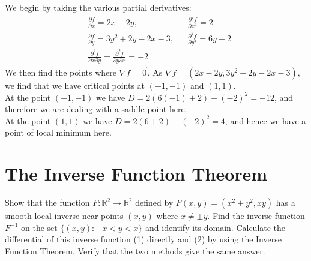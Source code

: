 \documentclass[12pt]{book}
\newcommand{\R}{\mathbb{R}}
\newenvironment{exercise}[2][Exercise]{\begin{trivlist}
\item[\hskip \labelsep {\bfseries #1}\hskip \labelsep {\bfseries #2.}]}{\end{trivlist}}
\begin{document}
\begin{exercise}{7.2.7}
\begin{exercise}{9.5.9}
    We begin by taking the various partial derivatives:
    \begin{align*}
        &\frac{\partial f}{\partial x} = 2x-2y, &&\frac{\partial^2 f}{\partial x^2} = 2 \\
        &\frac{\partial f}{\partial y} = 3y^2+2y-2x-3, &&\frac{\partial^2 f}{\partial y^2}=6y+2\\
        &\frac{\partial^2 f}{\partial x \partial y} = \frac{\partial^2 f}{\partial y \partial x} = -2
    \end{align*}
    We then find the points where $\nabla f= \vec{0}$. As $\nabla f= \left( 2x-2y, 3y^2+2y-2x-3\right)$, we find that we have critical points at $(-1,-1)$ and $(1,1)$. \\
    At the point $(-1,-1)$ we have $D=2 (6(-1)+2) - (-2)^2= -12$, and therefore we are dealing with a saddle point here.\\
    At the point $(1,1)$ we have $D=2(6+2)-(-2)^2=4$, and hence we have a point of local minimum here.
\end{exercise}




\section{The Inverse Function Theorem}


\begin{exercise}{9.6.2}
    Show that the function $F: \R^2 \to \R^2$ defined by $F(x,y) = (x^2+y^2, x y)$ has a smooth local inverse near points $(x,y)$ where $x \neq \pm y$. Find the inverse function $F^{-1}$ on the set $\{(x,y) : -x < y < x\}$ and identify its domain. Calculate the differential of this inverse function (1) directly and (2) by using the Inverse Function Theorem. Verify that the two methods give the same answer.  \\


\end{exercise}
\end{exercise}
\end{document}
